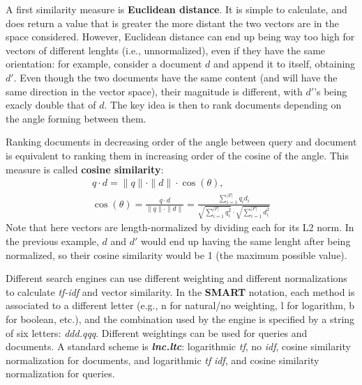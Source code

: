 A first similarity measure is \textbf{Euclidean distance}. It is simple to calculate, and does return a value that is greater the more distant the two vectors are in the space considered. However, Euclidean distance can end up being way too high for vectors of different lenghts (i.e., unnormalized), even if they have the same orientation: for example, consider a document $d$ and append it to itself, obtaining $d'$. Even though the two documents have the same content (and will have the same direction in the vector space), their magnitude is different, with $d'$'s being exacly double that of $d$. The key idea is then to rank documents depending on the angle forming between them.

Ranking documents in decreasing order of the angle between query and document is equivalent to ranking them in increasing order of the cosine of the angle. This measure is called \textbf{cosine similarity}:
\begin{gather*}
    q \cdot d = \|q\| \cdot \|d\| \cdot \cos(\theta), \\
    \cos(\theta) = \frac{q \cdot d}{\|q\| \cdot \|d\|} = \frac{\sum_{i=1}^{|F|} q_i d_i}{\sqrt{\sum_{i=1}^{|F|} q_i^2} \cdot \sqrt{\sum_{i=1}^{|F|} d_i^2}}
\end{gather*}
Note that here vectors are length-normalized by dividing each for its L2 norm. In the previous example, $d$ and $d'$ would end up having the same lenght after being normalized, so their cosine similarity would be 1 (the maximum possible value).

Different search engines can use different weighting and different normalizations to calculate \textit{tf-idf} and vector similarity. In the \textbf{SMART} notation, each method is associated to a different letter (e.g., n for natural/no weighting, l for logarithm, b for boolean, etc.), and the combination used by the engine is specified by a string of six letters: \textit{ddd.qqq}. Different weightings can be used for queries and documents. A standard scheme is \textbf{\textit{lnc.ltc}}: logarithmic \textit{tf}, no \textit{idf}, cosine similarity normalization for documents, and logarithmic \textit{tf} \textit{idf}, and cosine similarity normalization for queries.